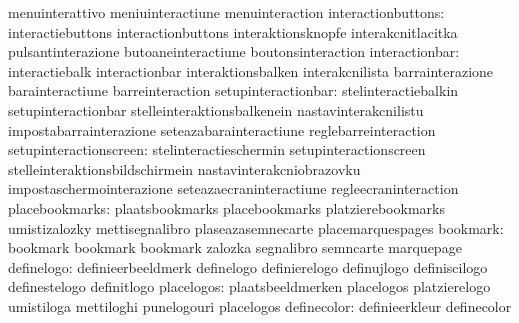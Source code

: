                                   menuinterattivo                  meniuinteractiune
                                  menuinteraction
              interactionbuttons: interactiebuttons                interactionbuttons
                                  interaktionsknopfe               interakcnitlacitka
                                  pulsantinterazione               butoaneinteractiune
                                  boutonsinteraction
                  interactionbar: interactiebalk                   interactionbar
                                  interaktionsbalken               interakcnilista
                                  barrainterazione                 barainteractiune
                                  barreinteraction
             setupinteractionbar: stelinteractiebalkin             setupinteractionbar
                                  stelleinteraktionsbalkenein      nastavinterakcnilistu
                                  impostabarrainterazione          seteazabarainteractiune
                                  reglebarreinteraction
          setupinteractionscreen: stelinteractieschermin           setupinteractionscreen
                                  stelleinteraktionsbildschirmein  nastavinterakcniobrazovku
                                  impostaschermointerazione        seteazaecraninteractiune
                                  regleecraninteraction
                  placebookmarks: plaatsbookmarks                  placebookmarks
                                  platzierebookmarks               umistizalozky
                                  mettisegnalibro                  plaseazasemnecarte
                                  placemarquespages
                        bookmark: bookmark                         bookmark
                                  bookmark                         zalozka
                                  segnalibro                       semncarte
                                  marquepage
                      definelogo: definieerbeeldmerk               definelogo
                                  definierelogo                    definujlogo
                                  definiscilogo                    definestelogo
                                  definitlogo
                      placelogos: plaatsbeeldmerken                placelogos
                                  platzierelogo                    umistiloga
                                  mettiloghi                       punelogouri
                                  placelogos
                     definecolor: definieerkleur                   definecolor
